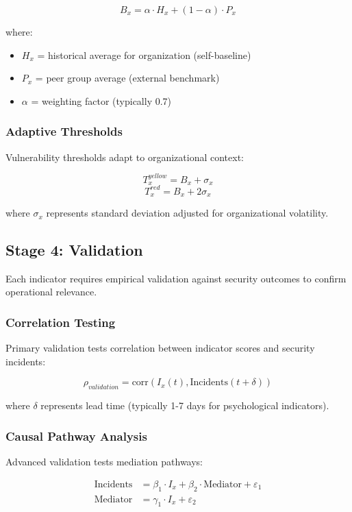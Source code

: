 \documentclass[11pt, onecolumn]{article}
\begin{document}
$$B_x = \alpha \cdot H_x + (1-\alpha) \cdot P_x$$

where:
\begin{itemize}
\item $H_x$ = historical average for organization (self-baseline)
\item $P_x$ = peer group average (external benchmark)
\item $\alpha$ = weighting factor (typically 0.7)
\end{itemize}

\subsubsection{Adaptive Thresholds}

Vulnerability thresholds adapt to organizational context:

$$T_x^{yellow} = B_x + \sigma_x$$
$$T_x^{red} = B_x + 2\sigma_x$$

where $\sigma_x$ represents standard deviation adjusted for organizational volatility.

\subsection{Stage 4: Validation}

Each indicator requires empirical validation against security outcomes to confirm operational relevance.

\subsubsection{Correlation Testing}

Primary validation tests correlation between indicator scores and security incidents:

$$\rho_{validation} = \text{corr}(I_x(t), \text{Incidents}(t+\delta))$$

where $\delta$ represents lead time (typically 1-7 days for psychological indicators).

\subsubsection{Causal Pathway Analysis}

Advanced validation tests mediation pathways:

\begin{align}
\text{Incidents} &= \beta_1 \cdot I_x + \beta_2 \cdot \text{Mediator} + \varepsilon_1 \\
\text{Mediator} &= \gamma_1 \cdot I_x + \varepsilon_2
\end{align}
\end{document}
